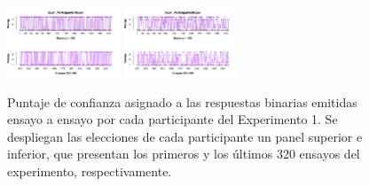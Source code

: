 \begin{figure}[th]
\includegraphics[width=0.30\textwidth]{Figures/Rating_Exp1_P19} \includegraphics[width=0.30\textwidth]{Figures/Rating_Exp1_P20} 
\caption[Puntajes de Confianza asignados ensayo a ensayo; Experimento 1]{Puntaje de confianza asignado a las respuestas binarias emitidas ensayo a ensayo por cada participante del Experimento 1. Se despliegan las elecciones de cada participante un panel superior e inferior, que presentan los primeros y los últimos 320 ensayos del experimento, respectivamente.}
\label{fig:Rating_E1}
\end{figure}


